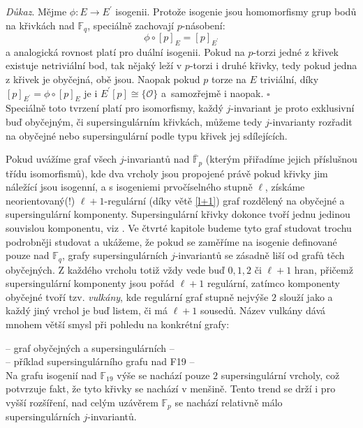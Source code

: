 \documentclass[12pt]{report}
\begin{document}
\noindent \textit{Důkaz}. Mějme $\phi : E \longrightarrow E^\prime$ isogenii. Protože isogenie jsou homomorfismy grup bodů na křivkách nad $\mathbb{F}_q$, speciálně zachovají $p$-násobení:
\begin{equation*}
\phi  \circ[p]_E = [p]_{E^\prime}
\end{equation*}
a analogická rovnost platí pro duální isogenii. Pokud na $p$-torzi jedné z křivek existuje netriviální bod, tak nějaký leží v $p$-torzi i druhé křivky, tedy pokud jedna z křivek je obyčejná, obě jsou. Naopak pokud $p$ torze na $E$ triviální, díky $[p]_{E^\prime} = \phi \circ [p]_E$ je i $E^\prime [p] \cong \lbrace \mathcal{O} \rbrace$ a~samozřejmě i naopak. \hfill $\square$\\

Speciálně toto tvrzení platí pro isomorfismy, každý $j$-invariant je proto exklusivní buď obyčejným, či supersingulárním křivkách, můžeme tedy $j$-invarianty rozřadit na obyčejné nebo supersingulární podle typu křivek jej sdílejících.

Pokud uvážíme graf všech $j$-invariantů nad $\overline{\mathbb{F}}_p$ (kterým přiřadíme jejich příslušnou třídu isomorfismů), kde dva vrcholy jsou propojené právě pokud křivky jim náležící jsou isogenní, a s isogeniemi prvočíselného stupně $\ell$, získáme neorientovaný(!) $\ell+1$-regulární (díky větě \ref{l+1}) graf rozdělený na obyčejné a supersingulární komponenty. Supersingulární křivky dokonce tvoří jednu jedinou souvislou komponentu, viz \cite[Cor. 78]{Kohel}. Ve čtvrté kapitole budeme tyto graf studovat trochu podrobněji studovat a ukážeme, že pokud se zaměříme na isogenie definované pouze nad $\mathbb{F}_q$, grafy supersingulárních $j$-invariantů se zásadně liší od grafů těch obyčejných. Z každého vrcholu totiž vždy vede buď $0,1,2$ či $\ell+1$ hran, přičemž supersingulární komponenty jsou pořád $\ell+1$ regulární, zatímco komponenty obyčejné tvoří tzv. \textit{vulkány}, kde regulární graf stupně nejvýše $2$ slouží jako  a každý jiný vrchol je buď listem, či má $\ell+1$ sousedů. Název vulkány dává mnohem větší smysl při pohledu na konkrétní grafy:

-- graf obyčejných a supersingulárních --\\

-- příklad supersingulárního grafu nad F19 --\\

Na grafu isogenií nad $\mathbb{F}_{19}$ výše se nachází pouze $2$ supersingulární vrcholy, což potvrzuje fakt, že tyto křivky se nachází v menšině. Tento trend se drží i pro vyšší rozšíření, nad celým uzávěrem $\mathbb{F}_p$ se nachází relativně málo supersingulárních $j$-invariantů.
\end{document}
